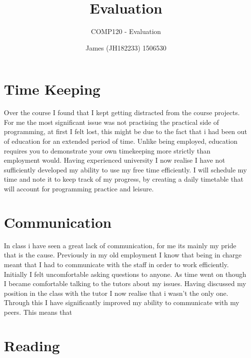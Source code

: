 \documentclass{scrartcl}
\title{Evaluation}
\subtitle{COMP120 - Evaluation}
\author{James (JH182233) 1506530}
\begin{document}
\maketitle

\section{Time Keeping}

Over the course I found that I kept getting distracted from the course projects. For me the most significant issue was not practising the practical side of programming, at first I felt lost, this might be due to the fact that i had been out of education for an extended period of time. Unlike being employed, education requires you to demonstrate your own timekeeping more strictly than employment would. Having experienced university I now realise I have not sufficiently developed my ability to use my free time efficiently. I will schedule my time and note it to keep track of my progress, by creating a daily timetable that will account for programming practice and leisure.

\section{Communication}

In class i have seen a great lack of communication, for me its mainly my pride that is the cause. Previously in my old employment I know that being in charge meant that I had to communicate with the staff in order to work efficiently. Initially I felt uncomfortable asking questions to anyone. As time went on though I became comfortable talking to the tutors about my issues. Having discussed my position in the class with the tutor I now realise that i wasn't the only one. Through this I have significantly improved my ability to communicate with my peers. This means that 

\section{Reading}




\end{document}
